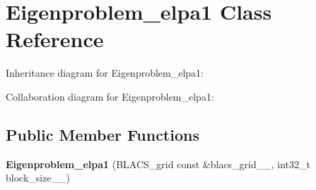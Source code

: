 \hypertarget{class_eigenproblem__elpa1}{}\section{Eigenproblem\+\_\+elpa1 Class Reference}
\label{class_eigenproblem__elpa1}


Inheritance diagram for Eigenproblem\+\_\+elpa1\+:


Collaboration diagram for Eigenproblem\+\_\+elpa1\+:
\subsection*{Public Member Functions}
\begin{DoxyCompactItemize}
\item 
\hypertarget{class_eigenproblem__elpa1_a977ccbd93f0decfd216b469c74ad5ea2}{}{\bfseries Eigenproblem\+\_\+elpa1} (B\+L\+A\+C\+S\+\_\+grid const \&blacs\+\_\+grid\+\_\+\+\_\+, int32\+\_\+t block\+\_\+size\+\_\+\+\_\+)\label{class_eigenproblem__elpa1_a977ccbd93f0decfd216b469c74ad5ea2}


\end{DoxyCompactItemize}
